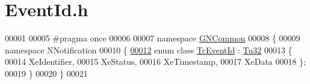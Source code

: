 \hypertarget{_event_id_8h_source}{}\section{Event\+Id.\+h}
\label{_event_id_8h_source}

\begin{DoxyCode}
00001 
00005 \textcolor{preprocessor}{#pragma once}
00006 
00007 \textcolor{keyword}{namespace }\mbox{\hyperlink{namespace_g_n_common}{GNCommon}}
00008 \{
00009    \textcolor{keyword}{namespace }NNotification
00010    \{
\mbox{\hyperlink{namespace_g_n_common_1_1_n_notification_a8d5ce0e5fbb0a6cdcd96e4b037656761}{00012}}       \textcolor{keyword}{enum class} \mbox{\hyperlink{namespace_g_n_common_1_1_n_notification_a8d5ce0e5fbb0a6cdcd96e4b037656761}{TcEventId}} : \mbox{\hyperlink{namespace_g_n_common_a941b527ef318f318aed7903dc832b7e4}{Tu32}}
00013       \{
00014          XeIdentifier,
00015          XeStatus,
00016          XeTimestamp,
00017          XeData
00018       \};
00019    \}
00020 \}
00021 
\end{DoxyCode}
